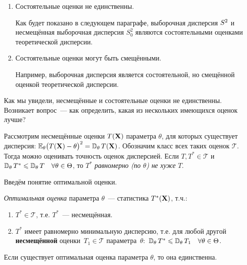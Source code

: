 \begin{rmrk}
\begin{enumerate}
    \item Состоятельные оценки не единственны.
    
    Как будет показано в следующем параграфе, выборочная дисперсия $S^{2}$ и несмещённая выборочная дисперсия $S_0^{2}$ являются состоятельными оценками теоретической дисперсии.
    
    \item Состоятельные оценки могут быть смещёнными.
    
    Например, выборочная дисперсия является состоятельной, но смещённой оценкой теоретической дисперсии.
    
    \end{enumerate}
\end{rmrk}

Как мы увидели, несмещённые и состоятельные оценки не единственны.
Возникает вопрос~--- как определить, какая из нескольких имеющихся оценок лучше?

Рассмотрим несмещённые оценки $T(\mathbf{X})$ параметра $\theta$, для которых существует дисперсия: $\operatorname{\operatorname{\mathbb{E}}_{\theta}} \bigl(T(\mathbf{X})-\theta\bigr)^{2}=\operatorname{\mathbb{D}_{\theta}} T(\mathbf{X})$.
Обозначим класс всех таких оценок $\mathcal{T}$.
Тогда можно оценивать точность оценок дисперсией.
Если $T, T^* \in \mathcal{T}$ и $\operatorname{\mathbb{D}_{\theta}} T^* \leqslant \operatorname{\mathbb{D}_{\theta}} T \quad \forall \theta \in \Theta$, то $T^*$ \textit{равномерно (по $\theta$) не хуже} $T$.

Введём понятие оптимальной оценки.
\begin{defn}
    \textit{Оптимальная оценка} параметра $\theta$~--- статистика $T^*(\mathbf{X})$, т.ч.:
    \begin{enumerate}
        \item $T^* \in \mathcal{T}$, т.е. $T^*$~--- несмещённая.
        \item $T^*$ имеет равномерно минимальную дисперсию, т.е. для любой другой \textbf{несмещённой} оценки~$T_{1} \in \mathcal{T}$ параметра~$\theta \colon$ ${\operatorname{\mathbb{D}_{\theta}} T^* \leqslant \operatorname{\mathbb{D}_{\theta}} T_{1}} \quad {\forall \theta \in \Theta}$.
    \end{enumerate}
\end{defn}

\vspace{5mm}
\begin{thm*}
    Если существует оптимальная оценка параметра $\theta$, то она единственна.
\end{thm*}

